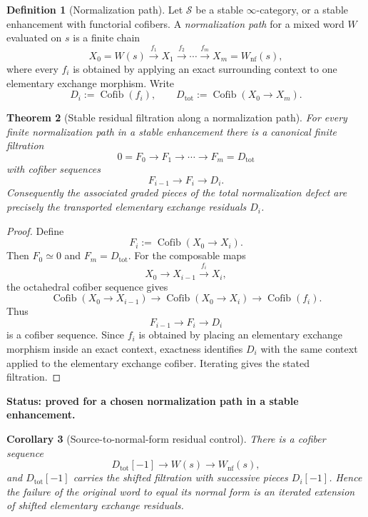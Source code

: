 \documentclass[11pt]{article}
\newtheorem{theorem}{Theorem}[section]
\newtheorem{corollary}[theorem]{Corollary}
\theoremstyle{definition}
\newtheorem{definition}[theorem]{Definition}
\theoremstyle{remark}
\newcommand{\Cofib}{\operatorname{Cofib}}
\newcommand{\status}[1]{\textbf{Status: #1.}}
\begin{document}
\begin{definition}[Normalization path]
Let $\mathcal S$ be a stable $\infty$-category, or a stable enhancement with functorial cofibers. A \emph{normalization path} for a mixed word $W$ evaluated on $s$ is a finite chain
\[
X_0=W(s)\xrightarrow{f_1}X_1\xrightarrow{f_2}\cdots\xrightarrow{f_m}X_m=W_{\mathrm{nf}}(s),
\]
where every $f_i$ is obtained by applying an exact surrounding context to one elementary exchange morphism. Write
\[
D_i:=\Cofib(f_i),
\qquad
D_{\mathrm{tot}}:=\Cofib(X_0\to X_m).
\]
\end{definition}

\begin{theorem}[Stable residual filtration along a normalization path]\label{thm:stable-filtration}
For every finite normalization path in a stable enhancement there is a canonical finite filtration
\[
0=F_0\longrightarrow F_1\longrightarrow\cdots\longrightarrow F_m=D_{\mathrm{tot}}
\]
with cofiber sequences
\[
F_{i-1}\longrightarrow F_i\longrightarrow D_i.
\]
Consequently the associated graded pieces of the total normalization defect are precisely the transported elementary exchange residuals $D_i$.
\end{theorem}

\begin{proof}
Define
\[
F_i:=\Cofib(X_0\longrightarrow X_i).
\]
Then $F_0\simeq0$ and $F_m=D_{\mathrm{tot}}$. For the composable maps
\[
X_0\longrightarrow X_{i-1}\xrightarrow{f_i}X_i,
\]
the octahedral cofiber sequence gives
\[
\Cofib(X_0\to X_{i-1})
\longrightarrow
\Cofib(X_0\to X_i)
\longrightarrow
\Cofib(f_i).
\]
Thus
\[
F_{i-1}\longrightarrow F_i\longrightarrow D_i
\]
is a cofiber sequence. Since $f_i$ is obtained by placing an elementary exchange morphism inside an exact context, exactness identifies $D_i$ with the same context applied to the elementary exchange cofiber. Iterating gives the stated filtration.
\end{proof}

\status{proved for a chosen normalization path in a stable enhancement}

\begin{corollary}[Source-to-normal-form residual control]\label{cor:source-normal-control}
There is a cofiber sequence
\[
D_{\mathrm{tot}}[-1]\longrightarrow W(s)\longrightarrow W_{\mathrm{nf}}(s),
\]
and $D_{\mathrm{tot}}[-1]$ carries the shifted filtration with successive pieces $D_i[-1]$. Hence the failure of the original word to equal its normal form is an iterated extension of shifted elementary exchange residuals.
\end{corollary}
\end{document}
